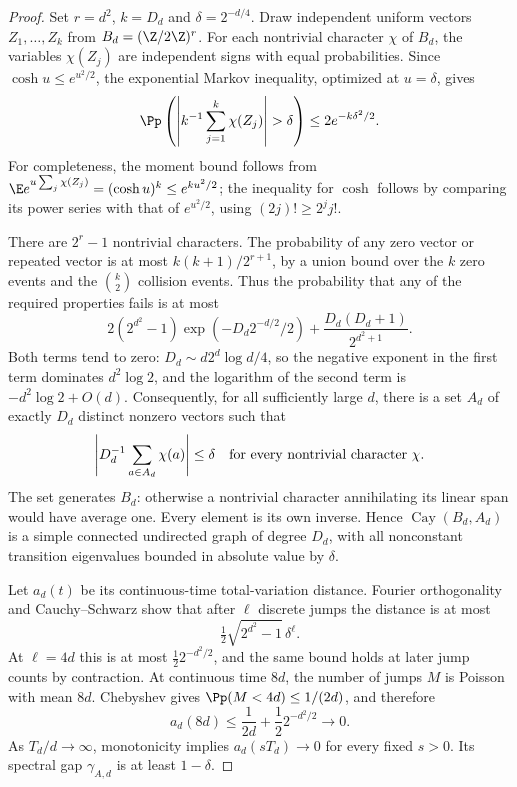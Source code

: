 \begin{proof}
Set $r=d^2$, $k=D_d$ and $\delta=2^{-d/4}$. Draw independent uniform vectors $Z_1,\ldots,Z_k$ from $B_d=(\Z/2\Z)^r$. For each nontrivial character $\chi$ of $B_d$, the variables $\chi(Z_j)$ are independent signs with equal probabilities. Since $\cosh u\le e^{u^2/2}$, the exponential Markov inequality, optimized at $u=\delta$, gives
\[
 \Pp\left(\left|k^{-1}\sum_{j=1}^k\chi(Z_j)\right|>\delta\right)
 \le 2e^{-k\delta^2/2}.
\]
For completeness, the moment bound follows from
$\E e^{u\sum_j\chi(Z_j)}=(\cosh u)^k\le e^{ku^2/2}$; the inequality for $\cosh$ follows by comparing its power series with that of $e^{u^2/2}$, using $(2j)!\ge2^j j!$.

There are $2^r-1$ nontrivial characters. The probability of any zero vector or repeated vector is at most $k(k+1)/2^{r+1}$, by a union bound over the $k$ zero events and the $\binom{k}{2}$ collision events. Thus the probability that any of the required properties fails is at most
\begin{equation}\label{eq:paddingbad}
 2(2^{d^2}-1)\exp\left(-D_d2^{-d/2}/2\right)
 +\frac{D_d(D_d+1)}{2^{d^2+1}}.
\end{equation}
Both terms tend to zero: $D_d\sim d2^d\log d/4$, so the negative exponent in the first term dominates $d^2\log2$, and the logarithm of the second term is $-d^2\log2+O(d)$. Consequently, for all sufficiently large $d$, there is a set $A_d$ of exactly $D_d$ distinct nonzero vectors such that
\[
 \left|D_d^{-1}\sum_{a\in A_d}\chi(a)\right|\le\delta
 \quad\hbox{for every nontrivial character }\chi.
\]
The set generates $B_d$: otherwise a nontrivial character annihilating its linear span would have average one. Every element is its own inverse. Hence $\operatorname{Cay}(B_d,A_d)$ is a simple connected undirected graph of degree $D_d$, with all nonconstant transition eigenvalues bounded in absolute value by $\delta$.

Let $a_d(t)$ be its continuous-time total-variation distance. Fourier orthogonality and Cauchy--Schwarz show that after $\ell$ discrete jumps the distance is at most
\[
 \tfrac12\sqrt{2^{d^2}-1}\,\delta^\ell.
\]
At $\ell=4d$ this is at most $\tfrac12 2^{-d^2/2}$, and the same bound holds at later jump counts by contraction. At continuous time $8d$, the number of jumps $M$ is Poisson with mean $8d$. Chebyshev gives $\Pp(M<4d)\le1/(2d)$, and therefore
\[
 a_d(8d)\le\frac1{2d}+\frac12 2^{-d^2/2}\longrightarrow0.
\]
As $T_d/d\to\infty$, monotonicity implies $a_d(sT_d)\to0$ for every fixed $s>0$. Its spectral gap $\gamma_{A,d}$ is at least $1-\delta$.


\end{proof}
